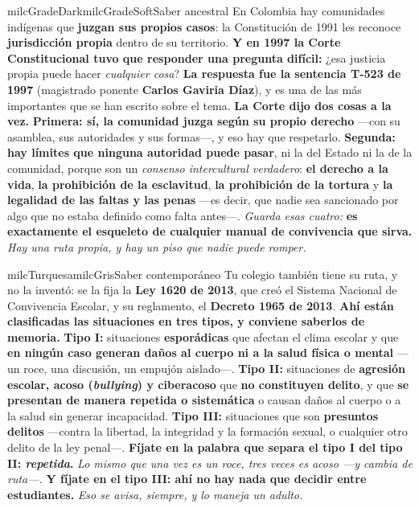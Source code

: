 \documentclass[11pt,letterpaper]{article}
\begin{document}
\begin{softbox}{milcGradeDark}{milcGradeSoft}{Saber ancestral}
En Colombia hay comunidades indígenas que \textbf{juzgan sus propios casos}: la Constitución de 1991 les reconoce \textbf{jurisdicción propia} dentro de su territorio. \textbf{Y en 1997 la Corte Constitucional tuvo que responder una pregunta difícil:} ¿esa justicia propia puede hacer \emph{cualquier cosa}? \textbf{La respuesta fue la sentencia T-523 de 1997} (magistrado ponente \textbf{Carlos Gaviria Díaz}), y es una de las más importantes que se han escrito sobre el tema. \textbf{La Corte dijo dos cosas a la vez.} \textbf{Primera: sí, la comunidad juzga según su propio derecho} ---con su asamblea, sus autoridades y sus formas---, y eso hay que respetarlo. \textbf{Segunda: hay límites que ninguna autoridad puede pasar}, ni la del Estado ni la de la comunidad, porque son un \emph{consenso intercultural verdadero}: \textbf{el derecho a la vida}, \textbf{la prohibición de la esclavitud}, \textbf{la prohibición de la tortura} y \textbf{la legalidad de las faltas y las penas} ---es decir, que nadie sea sancionado por algo que no estaba definido como falta antes---. \emph{Guarda esas cuatro:} \textbf{es exactamente el esqueleto de cualquier manual de convivencia que sirva.} \emph{Hay una ruta propia, y hay un piso que nadie puede romper.}
\end{softbox}

\begin{softbox}{milcTurquesa}{milcGris}{Saber contemporáneo}
Tu colegio también tiene su ruta, y no la inventó: se la fija la \textbf{Ley 1620 de 2013}, que creó el Sistema Nacional de Convivencia Escolar, y su reglamento, el \textbf{Decreto 1965 de 2013}. \textbf{Ahí están clasificadas las situaciones en tres tipos, y conviene saberlos de memoria.} \textbf{Tipo I:} situaciones \textbf{esporádicas} que afectan el clima escolar y que \textbf{en ningún caso generan daños al cuerpo ni a la salud física o mental} ---un roce, una discusión, un empujón aislado---. \textbf{Tipo II:} situaciones de \textbf{agresión escolar, acoso (\emph{bullying}) y ciberacoso} que \textbf{no constituyen delito}, y que \textbf{se presentan de manera repetida o sistemática} o causan daños al cuerpo o a la salud sin generar incapacidad. \textbf{Tipo III:} situaciones que son \textbf{presuntos delitos} ---contra la libertad, la integridad y la formación sexual, o cualquier otro delito de la ley penal---. \textbf{Fíjate en la palabra que separa el tipo I del tipo II: \emph{repetida}.} \emph{Lo mismo que una vez es un roce, tres veces es acoso ---y cambia de ruta---.} \textbf{Y fíjate en el tipo III: ahí no hay nada que decidir entre estudiantes.} \emph{Eso se avisa, siempre, y lo maneja un adulto.}
\end{softbox}
\end{document}
